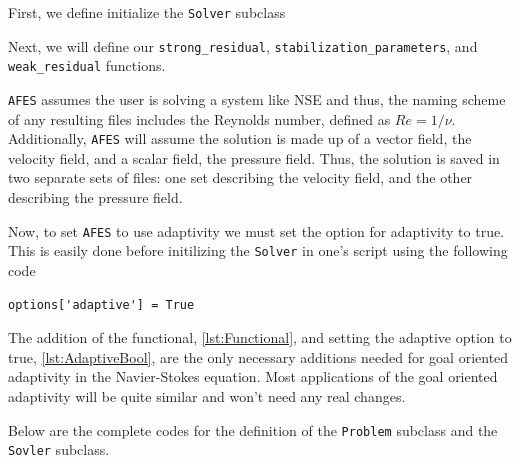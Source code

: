     First, we define initialize the \texttt{Solver} subclass
    

    Next, we will define our \texttt{strong\_residual},
    \texttt{stabilization\_parameters}, and \texttt{weak\_residual} functions.
    

    \begin{remark}
        \texttt{AFES} assumes the user is solving a system like NSE and thus,
        the naming scheme of any resulting files includes the Reynolds number,
        defined as $Re=1/\nu$. Additionally, \texttt{AFES} will assume the
        solution is made up of a vector field, the velocity field, and a
        scalar field, the pressure field. Thus, the solution is saved in two
        separate sets of files: one set describing the velocity field, and the
        other describing the pressure field.
    \end{remark}

    Now, to set \texttt{AFES} to use adaptivity we must set the option for
    adaptivity to true. This is easily done before initilizing the
    \texttt{Solver} in one's script using the following code
    \begin{lstlisting}[label={lst:AdaptiveBool},
                       caption={Setting the the adaptive boolean to true.}]
        options['adaptive'] = True
    \end{lstlisting}

    The addition of the functional, \autoref{lst:Functional}, and setting the
    adaptive option to true, \autoref{lst:AdaptiveBool}, are the only necessary
    additions needed for goal oriented adaptivity in the Navier-Stokes equation.
    Most applications of the goal oriented adaptivity will be quite similar and
    won't need any real changes.

    Below are the complete codes for the definition of the \texttt{Problem}
    subclass and the \texttt{Sovler} subclass.
    

    

